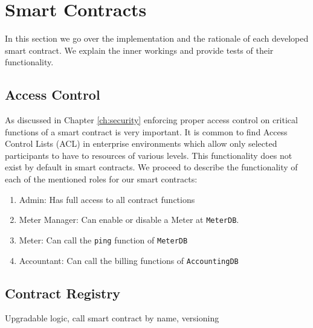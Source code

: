 \section{Smart Contracts} \label{ch:implementation:sc}
In this section we go over the implementation and the rationale of each developed smart contract. We explain the inner workings and provide tests of their functionality. %

\subsection{Access Control}
As discussed in Chapter \ref{ch:security} enforcing proper access control on critical functions of a smart contract is very important. It is common to find Access Control Lists (ACL) in enterprise environments which allow only selected participants to have to resources of various levels. This functionality does not exist by default in smart contracts. We proceed to describe the functionality of each of the mentioned roles for our smart contracts:
\begin{enumerate}
    \item Admin: Has full access to all contract functions
    \item Meter Manager: Can enable or disable a Meter at \texttt{MeterDB}.
    \item Meter: Can call the \texttt{ping} function of \texttt{MeterDB}
    \item Accountant: Can call the billing functions of \texttt{AccountingDB}
\end{enumerate}




\subsection{Contract Registry}
Upgradable logic, call smart contract by name, versioning

